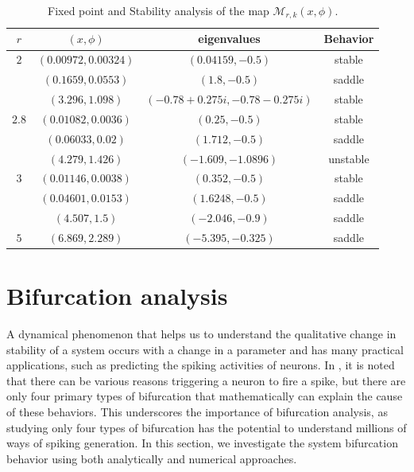 \documentclass{article}
\begin{document}
\begin{table}[ht!]
\centering
\caption{Fixed point and Stability analysis of the map $\mathcal{M}_{r,k}(x,\phi)$.}
\vline\begin{tabular}{||c||c||c||c||}
\hline
$r$ &     $(x,\phi)$  &      eigenvalues &              Behavior \\
\hline
$2$ & $(0.00972,0.00324)$ & $(0.04159,-0.5)$& stable \\ 
& $(0.1659,0.0553)$ & $(1.8,-0.5)$&  saddle\\ 
&$ (3.296,1.098)$ &$ (-0.78 + 0.275i, -0.78-0.275i)$& stable  \\
 \hline
$2.8$ & $(0.01082,0.0036)$ & $(0.25,-0.5)$&  stable\\ 
& $(0.06033,0.02)$ & $(1.712,-0.5)$& saddle \\
& $(4.279,1.426)$ &$ (-1.609,-1.0896)$& unstable \\
\hline
${3}$ & $(0.01146,0.0038)$ &$ (0.352,-0.5)$&  stable\\ 
& $(0.04601,0.0153)$ & $(1.6248,-0.5)$&  saddle\\  
& $(4.507,1.5)$ & $(-2.046,-0.9)$&  saddle\\ 
\hline
{$5$} & $(6.869,2.289)$ & $(-5.395,-0.325)$& saddle \\ 
 

\hline 
\end{tabular}\vline\label{Table:2}
\end{table}


\section{Bifurcation analysis}
A dynamical phenomenon that helps us to understand the qualitative change in stability of a system occurs with a change in a parameter and has many practical applications, such as predicting the spiking activities of neurons. In \cite{izhikevich2007dynamical}, it is noted that there can be various reasons triggering a neuron to fire a spike, but there are only four primary types of bifurcation that mathematically can explain the cause of these behaviors. This underscores the importance of bifurcation analysis, as studying only four types of bifurcation has the potential to understand millions of ways of spiking generation. In this section, we investigate the system bifurcation behavior using both analytically and numerical approaches. 
\end{document}
